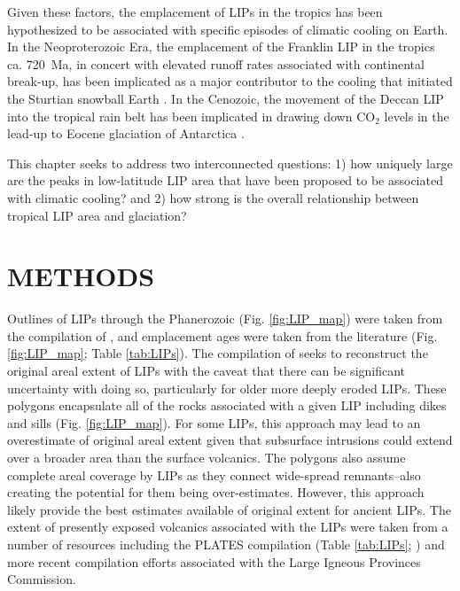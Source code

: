 \documentclass[11pt,letterpaper]{article}
\begin{document}
Given these factors, the emplacement of LIPs in the tropics has been hypothesized to be associated with specific episodes of climatic cooling on Earth. In the Neoproterozoic Era, the emplacement of the Franklin LIP in the tropics ca. 720~Ma, in concert with elevated runoff rates associated with continental break-up, has been implicated as a major contributor to the cooling that initiated the Sturtian snowball Earth \citep{Donnadieu2004b, Cox2016a}. In the Cenozoic, the movement of the Deccan LIP into the tropical rain belt has been implicated in drawing down CO$_2$ levels in the lead-up to Eocene glaciation of Antarctica \citep{Kent2008a}.

This chapter seeks to address two interconnected questions: 1) how uniquely large are the peaks in low-latitude LIP area that have been proposed to be associated with climatic cooling? and 2) how strong is the overall relationship between tropical LIP area and glaciation?

\section*{METHODS}

Outlines of LIPs through the Phanerozoic (Fig. \ref{fig:LIP_map}) were taken from the compilation of \citet{Ernst2017a}, and emplacement ages were taken from the literature (Fig. \ref{fig:LIP_map}; Table \ref{tab:LIPs}). The compilation of \citet{Ernst2017a} seeks to reconstruct the original areal extent of LIPs with the caveat that there can be significant uncertainty with doing so, particularly for older more deeply eroded LIPs. These polygons encapsulate all of the rocks associated with a given LIP including dikes and sills (Fig. \ref{fig:LIP_map}). For some LIPs, this approach may lead to an overestimate of original areal extent given that subsurface intrusions could extend over a broader area than the surface volcanics. The polygons also assume complete areal coverage by LIPs as they connect wide-spread remnants--also creating the potential for them being over-estimates. However, this approach likely provide the best estimates available of original extent for ancient LIPs.  The extent of presently exposed volcanics associated with the LIPs were taken from a number of resources including the PLATES compilation (Table \ref{tab:LIPs}; \citealp{Coffin2006a}) and more recent compilation efforts associated with the Large Igneous Provinces Commission. 
\end{document}
